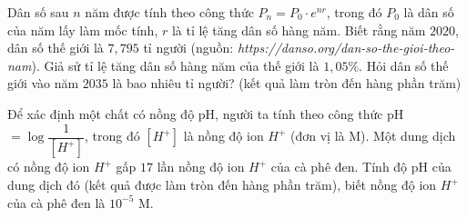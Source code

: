 \begin{bt}%

Dân số sau $n$ năm được tính theo công thức $P_n=P_0 \cdot e^{nr}$, trong đó $P_0$ là dân số của năm lấy làm mốc tính, $r$ là tỉ lệ tăng dân số hàng năm. Biết rằng năm $2020$, dân số thế giới là $7{,}795$ tỉ người (nguồn: \textit{https://danso.org/dan-so-the-gioi-theo-nam}). Giả sử tỉ lệ tăng dân số hàng năm của thế giới là $1{,}05\%$. Hỏi dân số thế giới vào năm $2035$ là bao nhiêu tỉ người? (kết quả làm tròn đến hàng phần trăm)
\end{bt}

\begin{bt}%

	Để xác định một chất có nồng độ pH, người ta tính theo công thức pH$=\log\dfrac{1}{\left[H^+\right]}$, trong đó $\left[H^+\right]$ là nồng độ ion $H^+$ (đơn vị là M). Một dung dịch có nồng độ ion $H^+$ gấp $17$ lần nồng độ ion $H^+$ của cà phê đen. Tính độ pH của dung dịch đó (kết quả được làm tròn đến hàng phần trăm), biết nồng độ ion $H^+$ của cà phê đen là $10^{-5}$ M.
\end{bt}

